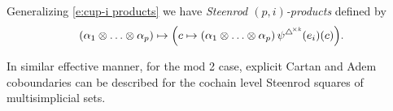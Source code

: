 Generalizing \eqref{e:cup-i products} we have \textit{Steenrod $(p,i)$-products} defined by
\[
(\alpha_1 \ot \dots \ot \alpha_p) \mapsto \Big( c \mapsto (\alpha_1 \ot \dots \ot \alpha_p) \, \psi^{\msimplex{k}}(e_{i})(c) \Big).
\]

In similar effective manner, for the mod 2 case, explicit Cartan and Adem coboundaries \cite{medina2020cartan, medina2020adem} can be described for the cochain level Steenrod squares of multisimplicial sets.